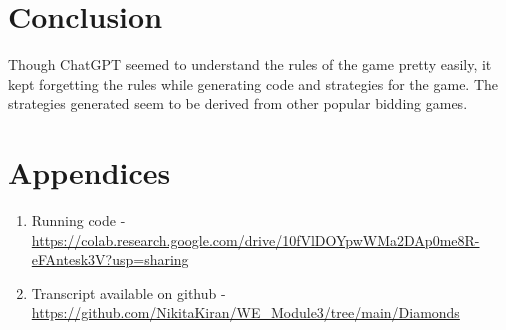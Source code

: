 \documentclass{article}
\begin{document}
\section{Conclusion}
Though ChatGPT seemed to understand the rules of the game pretty easily, it kept forgetting the rules while generating code and strategies for the game. The strategies generated seem to be derived from other popular bidding games.


\section{Appendices}
\begin{enumerate}
    \item Running code - \href{https://colab.research.google.com/drive/10fVlDOYpwWMa2DAp0me8R-eFAntesk3V?usp=sharing}{https://colab.research.google.com/drive/10fVlDOYpwWMa2DAp0me8R-eFAntesk3V?usp=sharing}
    \item Transcript available on github -\href{https://github.com/NikitaKiran/WE_Module3/tree/main/Diamonds}{https://github.com/NikitaKiran/WE\_Module3/tree/main/Diamonds}
\end{enumerate}
\end{document}
